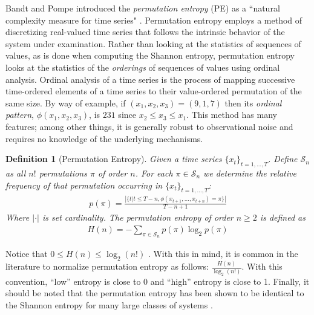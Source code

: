 \documentclass{article}
\newtheorem*{mydef}{Definition}
\begin{document}
Bandt and Pompe introduced the \emph{permutation entropy} (PE) as a ``natural
complexity measure for time series" \cite{bandt2002per}.  Permutation entropy
employs a method of discretizing real-valued time series that follows the
intrinsic behavior of the system under examination.  Rather than looking at the
statistics of sequences of values, as is done when computing the Shannon
entropy, permutation entropy looks at the statistics of the \emph{orderings} of
sequences of values using ordinal analysis. Ordinal analysis of a time series is
the process of mapping successive time-ordered elements of a time series to
their value-ordered permutation of the same size.  By way of example, if $(x_1,
x_2, x_3) = (9, 1, 7)$ then its \emph{ordinal pattern}, $\phi(x_1, x_2, x_3)$,
is $231$ since $x_2 \leq x_3 \leq x_1$.  This method has many features; among
other things, it is generally robust to observational noise and requires no
knowledge of the underlying mechanisms.

\begin{mydef}[Permutation Entropy]

  Given a time series $\{x_t\}_{t = 1,\dots,T}$. Define $\mathcal{S}_n$ as all
  $n!$ permutations $\pi$ of order $n$. For each $\pi \in \mathcal{S}_n$ we
  determine the relative frequency of that permutation occurring in $\{x_t\}_{t
  = 1,\dots,T}$:
  \begin{align*}
    p(\pi) = \frac{\left|\{t|t \leq T-n,\phi(x_{t+1},\dots,x_{t+n}) = \pi\}\right|}{T-n+1}
  \end{align*}
  Where $|\cdot|$ is set cardinality. The \emph{permutation entropy} of order $n
  \ge 2$ is defined as
  \begin{align*}
  H(n) = - \sum_{\pi \in \mathcal{S}_n} p(\pi) \log_2 p(\pi)
  \end{align*}

\end{mydef}

Notice that $0\le H(n) \le \log_2(n!)$ \cite{bandt2002per}.  With this in mind,
it is common in the literature to normalize permutation entropy as follows:
$\frac{H(n)}{\log_2(n!)}$.  With this convention, ``low'' entropy is close to 0
and ``high'' entropy is close to 1. Finally, it should be noted that the
permutation entropy has been shown to be identical to the Shannon entropy for
many large classes of systems \cite{amigo2012permutation}.
\end{document}
